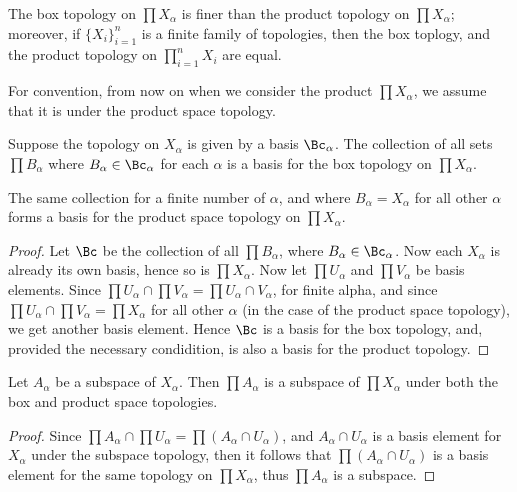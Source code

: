 \begin{corollary}
    The box topology on $\prod{X_{\alpha}}$ is finer than the product topology on
    $\prod{X_{\alpha}}$; moreover, if $\{X_{i}\}_{i=1}^{n}$ is a finite  family of topologies, then
    the box toplogy, and the product topology on $\prod_{i=1}^{n}{X_i}$ are equal.
\end{corollary}

For convention, from now on when we consider the product $\prod{X_{\alpha}}$, we assume that it is
under the product space topology.

\begin{theorem}\label{2.1.4}
    Suppose the topology on $X_{\alpha}$ is given by a basis $\Bc_{\alpha}$. The collection of all
    sets $\prod{B_{\alpha}}$ where $B_{\alpha} \in \Bc_{\alpha}$ for each $\alpha$ is a basis for
    the box topology on  $\prod{X_{\alpha}}$.

    The same collection for a finite number of $\alpha$, and where  $B_{\alpha}=X_{\alpha}$ for all
    other $\alpha$ forms a basis for the product space topology on  $\prod{X_{\alpha}}$.
\end{theorem}
\begin{proof}
    Let $\Bc$ be the collection of all  $\prod{B_{\alpha}}$, where $B_{\alpha} \in \Bc_{\alpha}$.
    Now each $X_{\alpha}$ is already its own basis, hence so is $\prod{X_{\alpha}}$. Now let
    $\prod{U_{\alpha}}$ and $\prod{V_{\alpha}}$ be basis elements. Since $\prod{U_{\alpha}} \cap
    \prod{V_{\alpha}}=\prod{U_{\alpha} \cap V_{\alpha}}$, for finite alpha, and since
    $\prod{U_{\alpha}} \cap \prod{V_{\alpha}}=\prod{X_{\alpha}}$ for all other $\alpha$  (in the
    case of the product space topology), we get another basis element. Hence $\Bc$ is a basis for
    the box topology, and, provided the necessary condidition, is also a basis for the product
    topology.
\end{proof}

\begin{theorem}\label{2.1.5}
    Let $A_{\alpha}$ be a subspace of $X_{\alpha}$. Then $\prod{A_{\alpha}}$ is a subspace of
    $\prod{X_{\alpha}}$ under both the box and product space topologies.
\end{theorem}
\begin{proof}
   Since $\prod{A_{\alpha}} \cap \prod{U_{\alpha}}=\prod{(A_{\alpha} \cap
   U_{\alpha})}$, and $A_{\alpha}
   \cap U_{\alpha}$ is a basis element for $X_ {\alpha}$ under the subspace topology, then it follows that
   $\prod{(A_{\alpha} \cap U_{\alpha})}$ is a basis element for the same topology on
   $\prod{X_{\alpha}}$, thus $\prod{A_\alpha}$ is a subspace.
\end{proof}

